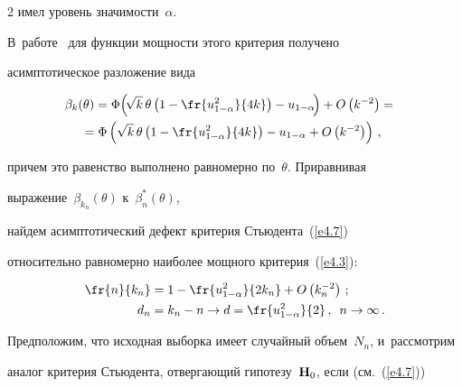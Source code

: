 \begin{multicols}{2}
имел уровень значимости~$\alpha$.


В~работе~\cite[формула~(5.6)]{1-ben} для функции мощности этого критерия получено 


асимптотическое разложение вида





\noindent


\begin{multline*}


\hspace*{-2mm}\beta_k(\theta) = \Phi\!\left(\!\sqrt {k}\, \theta \left(1 - 


\fr{u_{1-\alpha}^2}{4k}\right) - u_{1-\alpha}\!\right) +


 O\left(k^{-2}\right) ={}


\\


\hspace*{-3mm}{}= \Phi\left(\sqrt {k}\, \theta \left(1 - \fr{u_{1-\alpha}^2}{4k}\right) 


- u_{1-\alpha} +  O\left(k^{-2}\right)\right)\,,\!\!




\end{multline*}


причем это равенство выполнено равномерно по~$\theta$. Приравнивая 


выражение~$\beta_{k_n}(\theta)$ к~$\beta^*_n(\theta)$, 


найдем асимптотический дефект критерия Стьюдента~(\ref{e4.7}) 


относительно равномерно наиболее мощного критерия~(\ref{e4.3}):


\begin{align*}


\fr{n}{k_n} &= 1 - \fr{u_{1-\alpha}^2}{2k_n} +  O\left(k_n^{-2}\right)\,;\\


d_n &= k_n - n \to d = \fr{u_{1-\alpha}^2}{2}\,,\enskip n \to \infty\,.




\end{align*}


Предположим, что исходная выборка имеет случайный объем~$N_n$, и~рассмотрим 


аналог критерия Стьюдента, отвергающий гипотезу~${\bf H}_0$, если (см.~(\ref{e4.7}))


\begin{equation}



\end{equation}
\end{multicols}
